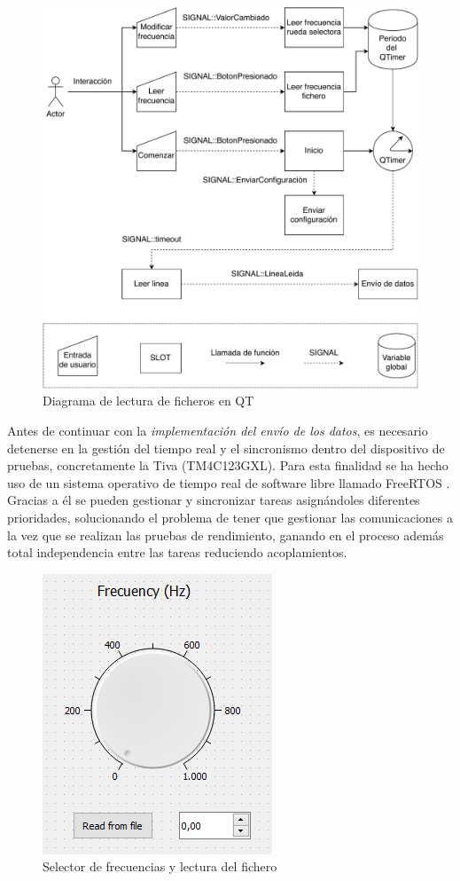         \begin{figure} [H] 
                \centering
                        \includegraphics[width =\linewidth]{figuras/CompleteFileRead.pdf}
                \caption{Diagrama de lectura de ficheros en QT}
                \label{fig:CompleteFileRead}
        \end{figure}

        Antes de continuar con la \textit{implementación del envío de los datos}, es necesario detenerse en la gestión del tiempo real y el sincronismo dentro del dispositivo de pruebas, concretamente la Tiva (TM4C123GXL). Para esta finalidad se ha hecho uso de un sistema operativo de tiempo real de software libre llamado FreeRTOS \cite{FreeRTOS}. Gracias a él se pueden gestionar y sincronizar tareas asignándoles diferentes prioridades, solucionando el problema de tener que gestionar las comunicaciones a la vez que se realizan las pruebas de rendimiento, ganando en el proceso además total independencia entre las tareas reduciendo acoplamientos.
        
        \begin{figure}[H]
                \centering
                        \includegraphics[width =0.4\linewidth]{figuras/FrecKnob.png}
                \caption{Selector de frecuencias y lectura del fichero}
                \label{fig:frecKnob}
        \end{figure}

